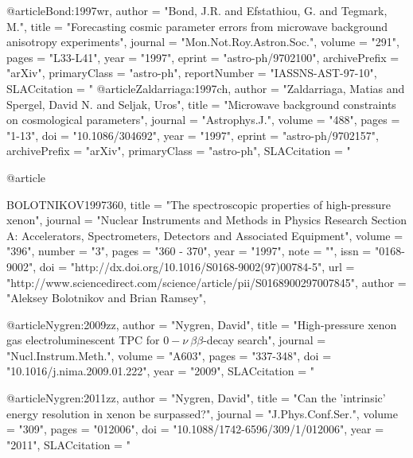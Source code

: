 @article{Bond:1997wr,
      author         = "Bond, J.R. and Efstathiou, G. and Tegmark, M.",
      title          = "{Forecasting cosmic parameter errors from microwave
                        background anisotropy experiments}",
      journal        = "Mon.Not.Roy.Astron.Soc.",
      volume         = "291",
      pages          = "L33-L41",
      year           = "1997",
      eprint         = "astro-ph/9702100",
      archivePrefix  = "arXiv",
      primaryClass   = "astro-ph",
      reportNumber   = "IASSNS-AST-97-10",
      SLACcitation   = "%
}
@article{Zaldarriaga:1997ch,
      author         = "Zaldarriaga, Matias and Spergel, David N. and Seljak,
                        Uros",
      title          = "{Microwave background constraints on cosmological
                        parameters}",
      journal        = "Astrophys.J.",
      volume         = "488",
      pages          = "1-13",
      doi            = "10.1086/304692",
      year           = "1997",
      eprint         = "astro-ph/9702157",
      archivePrefix  = "arXiv",
      primaryClass   = "astro-ph",
      SLACcitation   = "%
}


@article{BOLOTNIKOV1997360,
title = "The spectroscopic properties of high-pressure xenon",
journal = "Nuclear Instruments and Methods in Physics Research Section A: Accelerators, Spectrometers, Detectors and Associated Equipment",
volume = "396",
number = "3",
pages = "360 - 370",
year = "1997",
note = "",
issn = "0168-9002",
doi = "http://dx.doi.org/10.1016/S0168-9002(97)00784-5",
url = "http://www.sciencedirect.com/science/article/pii/S0168900297007845",
author = "Aleksey Bolotnikov and Brian Ramsey",

}

@article{Nygren:2009zz,
      author         = "Nygren, David",
      title          = "{High-pressure xenon gas electroluminescent TPC for $0-\nu ~ \beta \beta$-decay
      						 search}",
      journal        = "Nucl.Instrum.Meth.",
      volume         = "A603",
      pages          = "337-348",
      doi            = "10.1016/j.nima.2009.01.222",
      year           = "2009",
      SLACcitation   = "%
}

@article{Nygren:2011zz,
      author         = "Nygren, David",
      title          = "{Can the 'intrinsic' energy resolution in xenon be
                        surpassed?}",
      journal        = "J.Phys.Conf.Ser.",
      volume         = "309",
      pages          = "012006",
      doi            = "10.1088/1742-6596/309/1/012006",
      year           = "2011",
      SLACcitation   = "%
}

